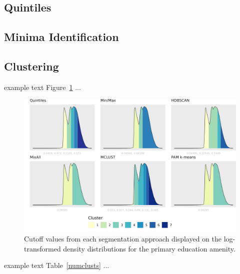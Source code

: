 \documentclass[11pt, a4paper]{article}
\begin{document}
\subsection{Quintiles}













\subsection{Minima Identification}











\subsection{Clustering}


example text Figure~\ref{prieduccutoffs} ...




\begin{figure}[H]
\centering
\includegraphics[width=\textwidth]{./cutoffs/by_amenity/Primary Education_cutoffs.png}
\caption[Primary education cutoffs]{Cutoff values from each segmentation approach displayed on the log-transformed density distributions for the primary education amenity.}\label{prieduccutoffs}
\end{figure}






example text Table~\ref{numclusts} ...
\end{document}

